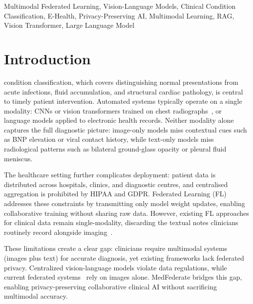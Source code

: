 \documentclass[conference]{IEEEtran}
\begin{document}
\begin{IEEEkeywords}
Multimodal Federated Learning, Vision-Language Models, Clinical Condition Classification, E-Health, Privacy-Preserving AI, Multimodal Learning, RAG, Vision Transformer, Large Language Model
\end{IEEEkeywords}

\section{Introduction}

 condition classification, which covers
distinguishing normal presentations from acute infections, fluid
accumulation, and structural cardiac pathology, is central to timely
patient intervention.
Automated systems typically operate on a single modality: CNNs or vision
transformers trained on chest radiographs~\cite{Rajpurkar2017,Irvin2019},
or language models applied to electronic health records.
Neither modality alone captures the full diagnostic picture: image-only
models miss contextual cues such as BNP elevation or viral contact
history, while text-only models miss radiological patterns such as
bilateral ground-glass opacity or pleural fluid meniscus.

The healthcare setting further complicates deployment: patient data is
distributed across hospitals, clinics, and diagnostic centres, and
centralised aggregation is prohibited by HIPAA and GDPR. Federated
Learning (FL) addresses these constraints by
transmitting only model weight updates, enabling collaborative training
without sharing raw data. However, existing FL approaches for clinical
data remain single-modality, discarding the textual notes clinicians
routinely record alongside imaging~\cite{Zhao2025,Mao2025,Yan2024}.

These limitations create a clear gap: clinicians require multimodal systems
(images plus text) for accurate diagnosis, yet existing frameworks lack
federated privacy. Centralized vision-language models
violate data regulations, while current federated systems~\cite{Zhao2025,Yan2024}
rely on images alone. MedFederate bridges this gap, enabling privacy-preserving
collaborative clinical AI without sacrificing multimodal accuracy.
\end{document}
